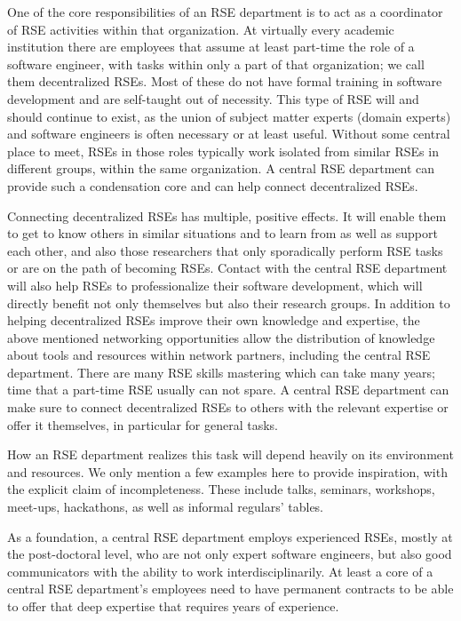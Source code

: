 \documentclass[a4paper]{article}
\begin{document}
One of the core responsibilities of an RSE department is to act as a coordinator of RSE activities within that organization.
At virtually every academic institution there are employees that assume at least part-time the role of a software engineer, with tasks within only a part of that organization; we call them decentralized RSEs.
Most of these do not have formal training in software development and are self-taught out of necessity.
This type of RSE will and should continue to exist, as the union of subject matter experts (domain experts) and software engineers is often necessary or at least useful.
Without some central place to meet, RSEs in those roles typically work isolated from similar RSEs in different groups, within the same organization.
A central RSE department can provide such a condensation core and can help connect decentralized RSEs.

Connecting decentralized RSEs has multiple, positive effects.
It will enable them to get to know others in similar situations and to learn from as well as support each other, and also those researchers that only sporadically perform RSE tasks or are on the path of becoming RSEs.
Contact with the central RSE department will also help RSEs to professionalize their software development, which will directly benefit not only themselves but also their research groups.
In addition to helping decentralized RSEs improve their own knowledge and expertise, the above mentioned networking opportunities allow the distribution of knowledge about tools and resources within network partners, including the central RSE department.
There are many RSE skills mastering which can take many years; time that a part-time RSE usually can not spare.
A central RSE department can make sure to connect decentralized RSEs to others with the relevant expertise or offer it themselves, in particular for general tasks.

How an RSE department realizes this task will depend heavily on its environment and resources. We only mention a few examples here to provide inspiration, with the explicit claim of incompleteness.
These include talks, seminars, workshops, meet-ups, hackathons, as well as informal regulars' tables.

As a foundation, a central RSE department employs experienced RSEs, mostly at the post-doctoral level, who are not only expert software engineers, but also good communicators with the ability to work interdisciplinarily.
At least a core of a central RSE department's employees need to have permanent contracts to be able to offer that deep expertise that requires years of experience.
\end{document}
